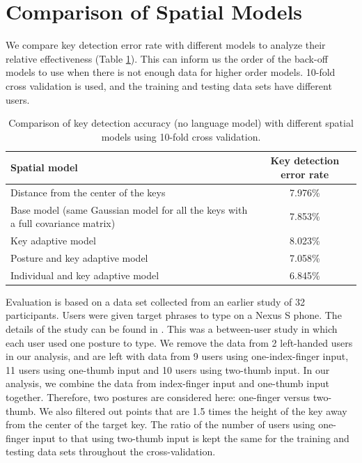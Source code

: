 \documentclass{sigchi}
\newcommand\tabhead[1]{\small\textbf{#1}}
\begin{document}
\section{Comparison of Spatial Models}
We compare key detection error rate with different models to analyze their
relative effectiveness (Table \ref{tab:comparison}). This can inform us the order of the
back-off models to use when there is not enough data for higher order models.
10-fold cross validation is used, and the training and testing data sets have
different users.

\begin{table} [tb]
  \centering
  \begin{tabular}{|l|c|}
    \hline
    \tabhead{Spatial model} &
    \multicolumn{1}{|p{0.2\columnwidth}|}{\centering\tabhead{Key detection
    error rate}} \\
    \hline
    Distance from the center of the keys & 7.976\% \\
    \hline
    \multicolumn{1}{|p{0.7\columnwidth}|}{Base model (same Gaussian model for
    all the keys with a full covariance matrix)} & 7.853\% \\
    \hline
    Key adaptive model  & 8.023\% \\
    \hline
    Posture and key adaptive model & 7.058\% \\
    \hline
    Individual and key adaptive model  & 6.845\% \\
    \hline
  \end{tabular}
  \caption{Comparison of key detection accuracy (no language model) with
  different spatial models using 10-fold cross validation.}
  \label{tab:comparison}
\end{table}

Evaluation is based on a data set collected from an earlier study of 32
participants. Users were given target phrases to type on a Nexus S phone. The
details of the study can be found in \cite{Azenkot:2012}. This was a between-user
study in which each user used one posture to type.
We remove the data from 2 left-handed users in our analysis, and are left with
data from 9 users using one-index-finger input, 11 users using one-thumb input and
10 users using two-thumb input.  In our analysis, we combine the data from index-finger input
and one-thumb input together. Therefore, two postures are considered here: one-finger versus two-thumb. We also filtered out points that are 1.5 times
the height of the key away from the center of the target key. The ratio
of the number of users using one-finger input to that using two-thumb input is kept the same
for the training and testing data sets throughout the cross-validation.
\end{document}
